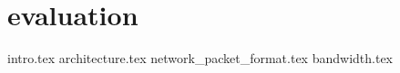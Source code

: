 \chapter{\confignoc{} evaluation}
\label{ch:3}
{intro.tex}
{architecture.tex}
{network_packet_format.tex}
{bandwidth.tex}